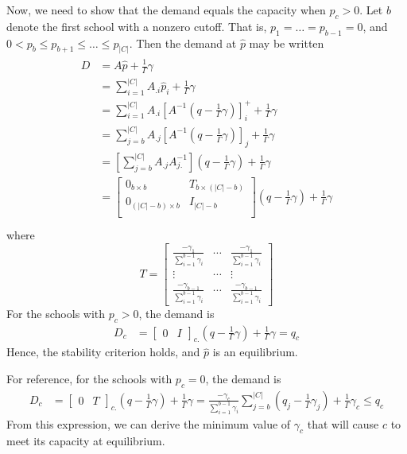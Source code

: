 \documentclass[12pt]{article}
\theoremstyle{definition}
\begin{document}
Now, we need to show that the demand equals the capacity when $p_c > 0$. Let $b$ denote the first school with a nonzero cutoff. That is, $p_1 = \dots = p_{b-1} = 0$, and $0 < p_b \leq p_{b+1} \leq \dots \leq p_{|C|}$. Then the demand at $\hat p$ may be written
\begin{gather*}\begin{aligned}
D &= A \hat p + \frac{1}{\Gamma}\gamma \\
&= \sum_{i=1}^{|C|} A_{.i} \hat p_i + \frac{1}{\Gamma}\gamma  \\
&= \sum_{i=1}^{|C|} A_{.i} \left[A^{-1} \left(q - \frac{1}{\Gamma}\gamma\right) \right]_i^+ + \frac{1}{\Gamma}\gamma  \\
&= \sum_{j=b}^{|C|} A_{.j} \left[A^{-1} \left(q - \frac{1}{\Gamma}\gamma\right) \right]_j + \frac{1}{\Gamma}\gamma  \\
&= \left[\sum_{j=b}^{|C|} A_{.j} A_{j.}^{-1} \right] \left(q - \frac{1}{\Gamma}\gamma\right) + \frac{1}{\Gamma}\gamma  \\
&= \begin{bmatrix}
0_{b \times b} & T_{b \times (|C| - b)} \\
0_{(|C| - b) \times b} & I_{|C| - b} \\
\end{bmatrix} \left(q - \frac{1}{\Gamma}\gamma\right) + \frac{1}{\Gamma}\gamma  \\
\end{aligned}\end{gather*}
where
\[T = \begin{bmatrix}
\frac{-\gamma_1}{\sum_{i=1}^{b-1} \gamma_i} & \cdots & \frac{-\gamma_1}{\sum_{i=1}^{b-1} \gamma_i} \\
\vdots & \cdots & \vdots \\
\frac{-\gamma_{b-1}}{\sum_{i=1}^{b-1} \gamma_i} & \cdots & \frac{-\gamma_{b-1}}{\sum_{i=1}^{b-1} \gamma_i}
\end{bmatrix}\]
For the schools with $p_c > 0$, the demand is
\begin{align*}
D_c &=
\begin{bmatrix}
0& I
\end{bmatrix}_{c.} \left(q - \frac{1}{\Gamma}\gamma\right) + \frac{1}{\Gamma}\gamma
= q_c
\end{align*}
Hence, the stability criterion holds, and $\hat p$ is an equilibrium.

For reference, for the schools with $p_c = 0$, the demand is 
\begin{align*}
D_c &=
\begin{bmatrix}
0& T
\end{bmatrix}_{c.} \left(q - \frac{1}{\Gamma}\gamma\right) + \frac{1}{\Gamma}\gamma  
= \frac{-\gamma_c}{\sum_{i=1}^{b-1} \gamma_i} \sum_{j=b}^{|C|} \left(q_j - \frac{1}{\Gamma}\gamma_j\right)  + \frac{1}{\Gamma}\gamma_c \leq q_c
\end{align*}
From this expression, we can derive the minimum value of $\gamma_c$ that will cause $c$ to meet its capacity at equilibrium. 
\end{document}
